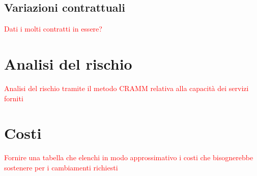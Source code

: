 	\subsection{Variazioni contrattuali}
	\textcolor{red}{Dati i molti contratti in essere?}
	
\newpage
\section{Analisi del rischio}
\textcolor{red}{Analisi del rischio tramite il metodo CRAMM relativa alla capacità dei servizi forniti}

\newpage
\section{Costi}
\textcolor{red}{Fornire una tabella che elenchi in modo approssimativo i costi che bisognerebbe sostenere per i cambiamenti richiesti}
